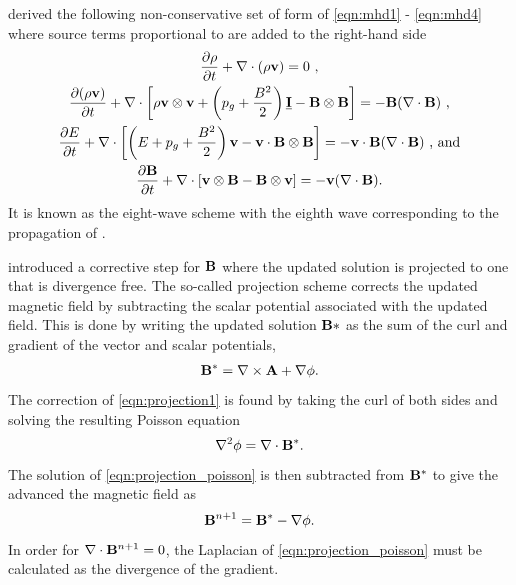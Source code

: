 \citet{Powell:1999} derived the following non-conservative set of form of \eqref{eqn:mhd1} - \eqref{eqn:mhd4} where source terms proportional to  are added to the right-hand side
\begin{gather}
\label{eqn:8wave1} \frac{\partial \rho}{\partial t} + \mathbf{\nabla} \cdot \left(\rho\mathbf{v}\right) = 0 \text{ ,} \\
\label{eqn:8wave2} \frac{\partial (\rho \mathbf{v})}{\partial t} + \mathbf{\nabla} \cdot \left[ \rho\mathbf{v} \otimes \mathbf{v} + \left( p_g + \frac{B^2}{2}\right)\underline{\mathbf{I}} - \mathbf{B} \otimes \mathbf{B}\right]  = -\mathbf{B}(\mathbf{\nabla} \cdot \mathbf{B}) \text{ ,}\\
\label{eqn:8wave3} \frac{\partial E}{\partial t} + \mathbf{\nabla} \cdot \left[ \left(E + p_g + \frac{B^2}{2}\right)\mathbf{v} - \mathbf{v} \cdot \mathbf{B} \otimes \mathbf{B}\right]  = -\mathbf{v}\cdot\mathbf{B}(\mathbf{\nabla} \cdot \mathbf{B}) \text{ , and} \\
\label{eqn:8wave4} \frac{\partial \mathbf{B}}{\partial t} + \mathbf{\nabla} \cdot \left[ \mathbf{v} \otimes \mathbf{B} - \mathbf{B} \otimes \mathbf{v}\right]  = -\mathbf{v}(\mathbf{\nabla} \cdot \mathbf{B}) \text{.}
\end{gather}
It is known as the eight-wave scheme with the eighth wave corresponding to the propagation of .  

\citet{Brackbill:1980} introduced a corrective step for $\mathbf{B}$ where the updated solution is projected to one that is  divergence free.  The so-called projection scheme corrects the updated magnetic field by subtracting the scalar potential associated with the updated field.  This is done by writing the updated solution $\mathbf{B*}$ as the sum of the curl and gradient of the vector and scalar potentials,
\begin{gather}
\label{eqn:projection1}
\mathbf{B}^* = \mathbf{\nabla} \times \mathbf{A} + \mathbf{\nabla}\phi.
\end{gather}
The correction of \eqref{eqn:projection1} is found by taking the curl of both sides and solving the resulting Poisson equation
\begin{gather}
\label{eqn:projection_poisson}
\mathbf{\nabla}^2\phi = \mathbf{\nabla} \cdot \mathbf{B^*}.
\end{gather} 
The solution of \eqref{eqn:projection_poisson} is then subtracted from $\mathbf{B}^*$ to give the advanced the magnetic field as
\begin{gather}
\label{eqn:projection2}
\mathbf{B}^{n+1} = \mathbf{B}^* - \mathbf{\nabla}\phi.
\end{gather} 
In order for $\mathbf{\nabla} \cdot \mathbf{B}^{n+1} = 0$, the Laplacian of \eqref{eqn:projection_poisson} must be calculated as the divergence of the gradient.

